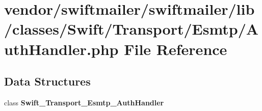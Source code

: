 \section{vendor/swiftmailer/swiftmailer/lib/classes/\+Swift/\+Transport/\+Esmtp/\+Auth\+Handler.php File Reference}
\label{_auth_handler_8php}
\subsection*{Data Structures}
\begin{DoxyCompactItemize}
\item 
class {\bf Swift\+\_\+\+Transport\+\_\+\+Esmtp\+\_\+\+Auth\+Handler}
\end{DoxyCompactItemize}

